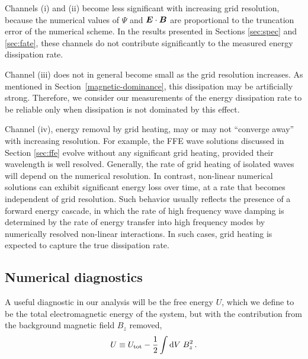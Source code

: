 Channels (i) and (ii) become less significant with increasing grid resolution, because the numerical values of $\Psi$ and $\boldsymbol{E}\cdot\boldsymbol{B}$ are proportional to the truncation error of the numerical scheme. In the results presented in Sections \ref{sec:spec} and \ref{sec:fate}, these channels do not contribute significantly to the measured energy dissipation rate.

Channel (iii) does not in general become small as the grid resolution increases. 
As mentioned in Section~\ref{magnetic-dominance}, this dissipation may be artificially strong.
Therefore, we consider our measurements of the energy dissipation rate to be reliable only when dissipation is not dominated by this effect.

Channel (iv), energy removal by grid heating, may or may not ``converge away'' with increasing resolution. For example, the FFE wave solutions discussed in Section \ref{sec:ffe} evolve without any significant grid heating, provided their wavelength is well resolved. Generally, the rate of grid heating of isolated waves will depend on the numerical resolution. In contrast, non-linear numerical solutions can exhibit significant energy loss over time, at a rate that becomes independent of grid resolution. Such behavior usually reflects the presence of a forward energy cascade, in which the rate of high frequency wave damping is determined by the rate of energy transfer into high frequency modes by numerically resolved non-linear interactions. In such cases, grid heating is expected to capture the true dissipation rate.

\subsection{Numerical diagnostics}
%
A useful diagnostic in our analysis will be the free energy $U$, which we define to be the total electromagnetic energy of the system, but with the contribution from the background magnetic field $B_z$ removed,
%
\begin{equation}
	U \equiv U_{\rm tot} - \frac{1}{2} \int \mathrm{d} V\; B_z^2 \, .
\end{equation}
%

